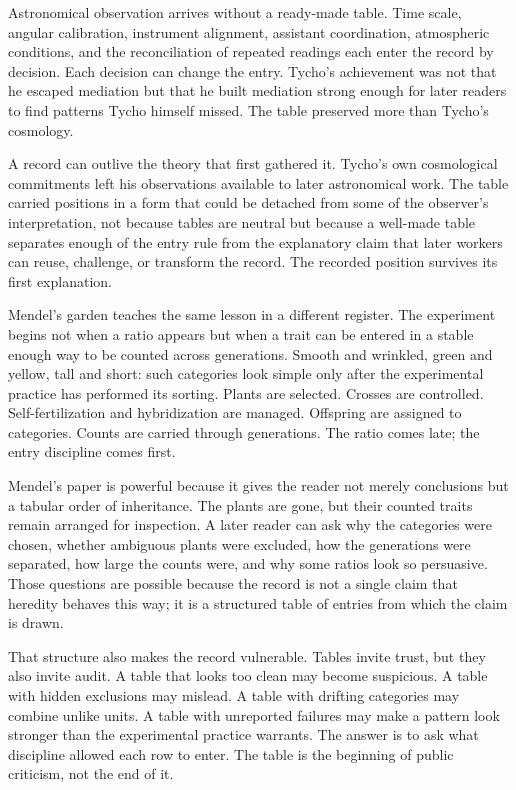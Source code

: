 Astronomical observation arrives without a ready-made table. Time scale,
angular calibration,
instrument alignment, assistant coordination, atmospheric conditions, and
the reconciliation of repeated readings each enter the record by decision.
Each decision can change the entry. Tycho's achievement was not that he
escaped mediation but that he built mediation strong enough for later
readers to find patterns Tycho himself missed. The table preserved more
than Tycho's cosmology.

A record can outlive the theory that first gathered it. Tycho's own
cosmological commitments left his observations available to later
astronomical work. The table carried positions in a form that could be
detached from some of the observer's interpretation, not because tables are
neutral but because a well-made table separates enough of the entry rule
from the explanatory claim that later workers can reuse, challenge, or
transform the record.
The recorded position survives its first explanation.

Mendel's garden teaches the same lesson in a different register. The
experiment begins not when a ratio appears but when a trait can be entered
in a stable enough way to be counted across generations. Smooth and
wrinkled, green and yellow, tall and short: such categories look simple
only after the experimental practice has performed its sorting. Plants are
selected. Crosses are controlled. Self-fertilization and hybridization are
managed. Offspring are assigned to categories. Counts are carried through
generations. The ratio comes late; the entry discipline comes first.

Mendel's paper is powerful because it gives the reader not merely
conclusions but a tabular order of inheritance. The plants are gone, but
their counted traits remain arranged for inspection. A later reader can ask
why the categories were chosen, whether ambiguous plants were excluded, how
the generations were separated, how large the counts were, and why some
ratios look so persuasive. Those questions are possible because the record
is not a single claim that heredity behaves this way; it is a structured
table of entries from which the claim is drawn.

That structure also makes the record vulnerable. Tables invite trust, but
they also invite audit. A table that looks too clean may become suspicious.
A table with hidden exclusions may mislead. A table with drifting
categories may combine unlike units. A table with unreported failures may
make a pattern look stronger than the experimental practice warrants. The
answer is to ask what discipline allowed each row to enter. The table is the beginning
of public criticism, not the end of it.

